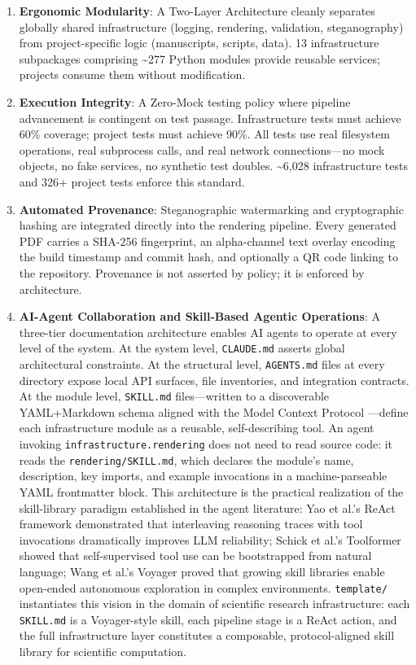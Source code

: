 \documentclass[
]{article}
\begin{document}
\begin{enumerate}
\def\labelenumi{\arabic{enumi}.}
\item
  \textbf{Ergonomic Modularity}: A Two-Layer Architecture cleanly
  separates globally shared infrastructure (logging, rendering,
  validation, steganography) from project-specific logic (manuscripts,
  scripts, data). 13 infrastructure subpackages comprising
  \textasciitilde277 Python modules provide reusable services; projects
  consume them without modification.
\item
  \textbf{Execution Integrity}: A Zero-Mock testing policy where
  pipeline advancement is contingent on test passage. Infrastructure
  tests must achieve 60\% coverage; project tests must achieve 90\%. All
  tests use real filesystem operations, real subprocess calls, and real
  network connections---no mock objects, no fake services, no synthetic
  test doubles. \textasciitilde6,028 infrastructure tests and 326+
  project tests enforce this standard.
\item
  \textbf{Automated Provenance}: Steganographic watermarking and
  cryptographic hashing are integrated directly into the rendering
  pipeline. Every generated PDF carries a SHA-256 fingerprint, an
  alpha-channel text overlay encoding the build timestamp and commit
  hash, and optionally a QR code linking to the repository. Provenance
  is not asserted by policy; it is enforced by architecture.
\item
  \textbf{AI-Agent Collaboration and Skill-Based Agentic Operations}: A
  three-tier documentation architecture enables AI agents to operate at
  every level of the system. At the system level, \texttt{CLAUDE.md}
  asserts global architectural constraints. At the structural level,
  \texttt{AGENTS.md} files at every directory expose local API surfaces,
  file inventories, and integration contracts. At the module level,
  \texttt{SKILL.md} files---written to a discoverable YAML+Markdown
  schema aligned with the Model Context Protocol
  \citep{anthropic2024mcp}---define each infrastructure module as a
  reusable, self-describing tool. An agent invoking
  \texttt{infrastructure.rendering} does not need to read source code:
  it reads the \texttt{rendering/SKILL.md}, which declares the module's
  name, description, key imports, and example invocations in a
  machine-parseable YAML frontmatter block. This architecture is the
  practical realization of the skill-library paradigm established in the
  agent literature: Yao et al.'s ReAct framework \citep{yao2023react}
  demonstrated that interleaving reasoning traces with tool invocations
  dramatically improves LLM reliability; Schick et al.'s Toolformer
  \citep{schick2023toolformer} showed that self-supervised tool use can
  be bootstrapped from natural language; Wang et al.'s Voyager
  \citep{wang2023voyager} proved that growing skill libraries enable
  open-ended autonomous exploration in complex environments.
  \texttt{template/} instantiates this vision in the domain of
  scientific research infrastructure: each \texttt{SKILL.md} is a
  Voyager-style skill, each pipeline stage is a ReAct action, and the
  full infrastructure layer constitutes a composable, protocol-aligned
  skill library for scientific computation.
\end{enumerate}
\end{document}
